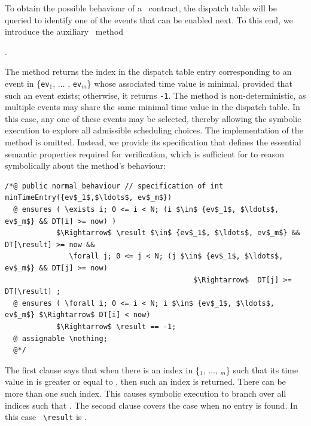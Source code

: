 To obtain the possible behaviour of a \Stipula\ contract, the dispatch
table will be queried to identify one of the events that can be
enabled next. To this end, we introduce the auxiliary \Java\ method
%
\begin{center}
  \enspace.
\end{center}

The method returns the index in the dispatch table entry corresponding
to an event in \{{\tt ev}$_1$, $\ldots$ , {\tt ev}$_m$\} whose
associated time value is minimal, provided that such an event exists;
otherwise, it returns {\tt -1}. The method is non-deterministic, as
multiple events may share the same minimal time value in the dispatch
table. In this case, any one of these events may be selected, thereby
allowing the symbolic execution to explore all admissible scheduling
choices.  The implementation of the method  is
omitted. Instead, we provide its {\JML} specification that defines the
essential semantic properties required for verification, which is
sufficient for {\KeY} to reason symbolically about the method's
behaviour:

{\small
\begin{lstlisting}[language={[JML]Java},frame=none,numbers=none,mathescape=true,escapechar=']
/*@ public normal_behaviour // specification of int minTimeEntry({ev$_1$,$\ldots$, ev$_m$})
  @ ensures ( \exists i; 0 <= i < N; (i $\in$ {ev$_1$, $\ldots$, ev$_m$} && DT[i] >= now) )
            $\Rightarrow$ \result $\in$ {ev$_1$, $\ldots$, ev$_m$} && DT[\result] >= now && 
               \forall j; 0 <= j < N; (j $\in$ {ev$_1$, $\ldots$, ev$_m$} && DT[j] >= now) 
                                            $\Rightarrow$  DT[j] >= DT[\result] ;
  @ ensures ( \forall i; 0 <= i < N; i $\in$ {ev$_1$, $\ldots$, ev$_m$} $\Rightarrow$ DT[i] < now)
            $\Rightarrow$ \result == -1;
  @ assignable \nothing; 
  @*/
\end{lstlisting}
}

The first  clause says that when there is an index in
\{\ev$_1$, $\ldots$, \ev$_m$\} such that its time value in  is
greater or equal to , then such an index is returned. There
can be more than one such index. This causes symbolic execution to
branch over all indices  such that
. The second 
clause covers the case when no entry is found. In this case {\tt
  {\textbackslash}result} is .

